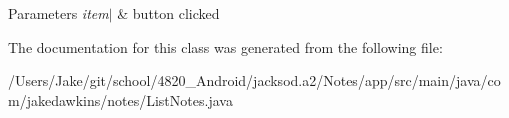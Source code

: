 \begin{DoxyParams}{Parameters}
{\em item$\vert$} & button clicked \\
\hline
\end{DoxyParams}


The documentation for this class was generated from the following file\+:\begin{DoxyCompactItemize}
\item 
/\+Users/\+Jake/git/school/4820\+\_\+\+Android/jacksod.\+a2/\+Notes/app/src/main/java/com/jakedawkins/notes/List\+Notes.\+java\end{DoxyCompactItemize}
